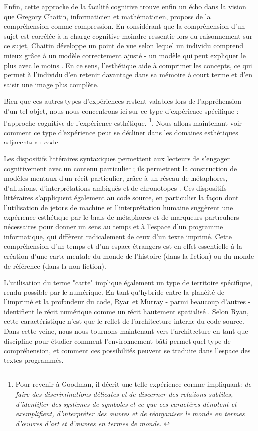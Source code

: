 \documentclass{article}
\begin{document}
Enfin, cette approche de la facilité cognitive trouve enfin un écho dans la vision que Gregory Chaitin, informaticien et mathématicien, propose de la compréhension comme compression. En considérant que la compréhension d'un sujet est corrélée à la charge cognitive moindre ressentie lors du raisonnement sur ce sujet, Chaitin développe un point de vue selon lequel un individu comprend mieux grâce à un modèle correctement ajusté - un modèle qui peut expliquer le plus avec le moins \citep{zenil_compression_2021}. En ce sens, l'esthétique aide à comprimer les concepts, ce qui permet à l'individu d'en retenir davantage dans sa mémoire à court terme et d'en saisir une image plus complète.

Bien que ces autres types d'expériences restent valables lors de l'appréhension d'un tel objet, nous nous concentrons ici sur ce type d'expérience spécifique : l'approche cognitive de l'expérience esthétique. \footnote{Pour revenir à Goodman, il décrit une telle expérience comme impliquant: \emph{de faire des discriminations délicates et de discerner des relations subtiles, d'identifier des systèmes de symboles et ce que ces caractères dénotent et exemplifient, d'interpréter des œuvres et de réorganiser le monde en termes d'œuvres d'art et d'œuvres en termes de monde.} \citep{goodman_languages_1976}}. Nous allons maintenant voir comment ce type d'expérience peut se décliner dans les domaines esthétiques adjacents au code.

Les dispositifs littéraires syntaxiques permettent aux lecteurs de s'engager cognitivement avec un contenu particulier ; ils permettent la construction de modèles mentaux d'un récit particulier, grâce à un réseau de métaphores, d'allusions, d'interprétations ambiguës et de chronotopes \citep{bakhtin_dialogic_1981}. Ces dispositifs littéraires s'appliquent également au code source, en particulier la façon dont l'utilisation de jetons de machine et l'interprétation humaine suggèrent une expérience esthétique par le biais de métaphores et de marqueurs particuliers nécessaires pour donner un sens au temps et à l'espace d'un programme informatique, qui diffèrent radicalement de ceux d'un texte imprimé. Cette compréhension d'un temps et d'un espace étrangers est en effet essentielle à la création d'une carte mentale du monde de l'histoire (dans la fiction) ou du monde de référence (dans la non-fiction).

L'utilisation du terme "carte" implique également un type de territoire spécifique, rendu possible par le numérique. En tant qu'hybride entre la planéité de l'imprimé et la profondeur du code, Ryan et Murray - parmi beaucoup d'autres - identifient le récit numérique comme un récit hautement spatialisé \citep{murray_hamlet_1998}. Selon Ryan, cette caractéristique n'est que le reflet de l'architecture interne du code source. Dans cette veine, nous nous tournons maintenant vers l'architecture en tant que discipline pour étudier comment l'environnement bâti permet quel type de compréhension, et comment ces possibilités peuvent se traduire dans l'espace des textes programmés.
\end{document}
